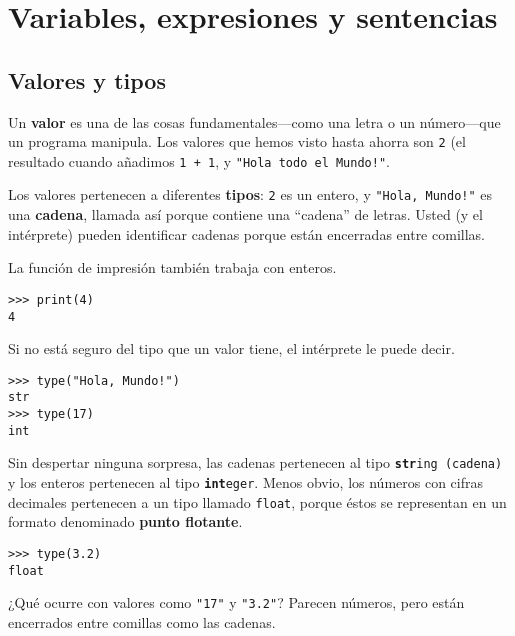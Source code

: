 
\chapter{Variables, expresiones y sentencias}

\section{Valores y tipos}

  

Un \textbf{valor} es una de las cosas fundamentales—como una letra
o un número—que un programa manipula. Los valores que hemos visto
hasta ahorra son \texttt{2} (el resultado cuando añadimos \texttt{1
+ 1}, y {\verb+"Hola todo el Mundo!"+}.

Los valores pertenecen a diferentes \textbf{tipos}: \texttt{2} es
un entero, y {\verb+"Hola, Mundo!"+} es una \textbf{cadena}, llamada
así porque contiene una ``cadena'' de letras. Usted (y el intérprete)
pueden identificar cadenas porque están encerradas entre comillas.

La función de impresión también trabaja con enteros.

\begin{lstlisting}
>>> print(4)
4
\end{lstlisting}
 

Si no está seguro del tipo que un valor tiene, el intérprete le puede
decir.

\begin{lstlisting}
>>> type("Hola, Mundo!")
str
>>> type(17)
int
\end{lstlisting}
 

Sin despertar ninguna sorpresa, las cadenas pertenecen al tipo \texttt{\textbf{str}}\texttt{ing
(cadena)} y los enteros pertenecen al tipo \texttt{\textbf{int}}\texttt{eger}.
Menos obvio, los números con cifras decimales pertenecen a un tipo
llamado \texttt{float}, porque éstos se representan en un formato
denominado \textbf{punto flotante}.

    
 

\begin{lstlisting}
>>> type(3.2)
float
\end{lstlisting}

¿Qué ocurre con valores como {\verb+"17"+} y {\verb+"3.2"+}?
Parecen números, pero están encerrados entre comillas como las cadenas.

